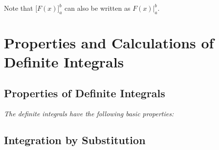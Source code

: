     Note that $\big[F(x)\big]_a^b$ can also be written as $F(x)\big|_a^b$.

    \newpage
    
    

    \section{Properties and Calculations of Definite Integrals}

    \subsection*{Properties of Definite Integrals}

    \noindent \hspace{1.2em}\textit{The definite integrals have the following basic properties:}

    \begin{center}
    \end{center}
    \begin{center}
    \end{center}
    \begin{center}
    \end{center}

    

    \subsection*{Integration by Substitution}

